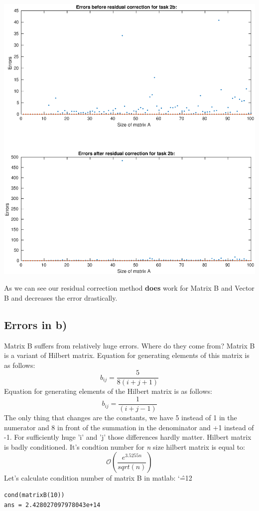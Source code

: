 \documentclass[12pt]{report}
\newenvironment{simplechar}{%
   \catcode`\^=12
}{}
\begin{document}
\begin{center}
   \includegraphics[scale=0.5]{errorsB.eps}
\end{center}
As we can see our residual correction method \textbf{does} work for Matrix B and Vector B and decreases the error drastically.

\subsection{Errors in b)}
Matrix B suffers from relatively huge errors. Where do they come from?
Matrix B is a variant of Hilbert matrix.
Equation for generating elements of this matrix is as follows:
\[ b_{ij} = \frac{5}{8(i + j + 1)} \]
Equation for generating elements of the Hilbert matrix is as follows:
\[ b_{ij} = \frac{1}{(i + j - 1)} \]
The only thing that changes are the constants, we have 5 instead of 1 in the numerator and 8 in front of the summation in the denominator and +1 instead of -1. For sufficiently huge 'i' and 'j' those differences hardly matter.
Hilbert matrix is badly conditioned. It's condtion number for \textit{n} size hilbert matrix is equal to:
\[ \mathcal{O}(\frac{e^{3.5255n}}{sqrt(n)}) \]
Let's calculate condition number of matrix B in matlab:
\begin{simplechar}
\begin{lstlisting}
cond(matrixB(10))
ans = 2.428027097978043e+14
\end{lstlisting}
\end{simplechar}
\end{document}
